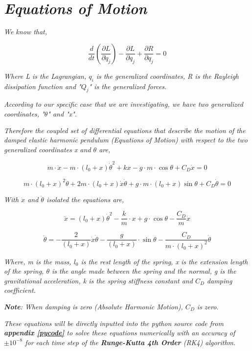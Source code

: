 
\section{\textit{Equations of Motion}}
            
    \textit{We know that,}
            
        $$\frac{d}{dt}\left(\frac{\partial L}{\partial \dot{q}_j}\right) - \frac{\partial L}{\partial q_j} + \frac{\partial R}{\partial q_j} = 0$$
            
    \textit{Where L is the Lagrangian, $q_i$ is the generalized coordinates, R is the Rayleigh dissipation function and "$Q_j$" is the generalized forces.}
            
    \textit{According to our specific case that we are investigating, we have two generalized coordinates, "$\theta$" and "x".}        
            
    \textit{Therefore the coupled set of differential equations that describe the motion of the damped elastic harmonic pendulum (Equations of Motion) with respect to the two generalized coordinates x and $\theta$ are,}
            
        $$m\cdot\ddot{x} -m\cdot(l_0+x)\dot{\theta}^2 + kx - g\cdot m\cdot\cos{\theta} + C_D\dot{x} = 0$$
            
        $$m\cdot(l_0+x)^2\ddot{\theta} + 2m\cdot(l_0+x)\dot{x}\dot{\theta} + g\cdot m\cdot(l_0+x)\sin{\theta} + C_D\dot{\theta} = 0$$
            
    \textit{With $\ddot{x}$ and $\ddot{\theta}$ isolated the equations are,}
            
        $$\ddot{x} = (l_0+x)\dot{\theta}^2 - \frac{k}{m}\cdot x + g\cdot\cos{\theta} - \frac{C_D}{m}\dot{x}$$
            
        $$\ddot{\theta} = - \frac{2}{(l_0+x)}\dot{x}\dot{\theta} - \frac{g}{(l_0+x)}\cdot\sin{\theta} - \frac{C_D}{m\cdot(l_0+x)^2}\dot{\theta}$$
            
    \textit{Where, m is the mass, $l_0$ is the rest length of the spring, x is the extension length of the spring, $\theta$ is the angle made between the spring and the normal, g is the gravitational acceleration, k is the spring stiffness constant and $C_D$ damping coefficient.}
            
    \textit{\textbf{Note}: When damping is zero (Absolute Harmonic Motion), $C_D$ is zero.}
            
    \textit{These equations will be directly inputted into the python source code from \textbf{appendix \ref{pycode}} to solve these equations numerically with an accuracy of $\pm 10^{-8}$ for each time step of the \textbf{Runge-Kutta 4th Order} (RK4) algorithm.}
           
